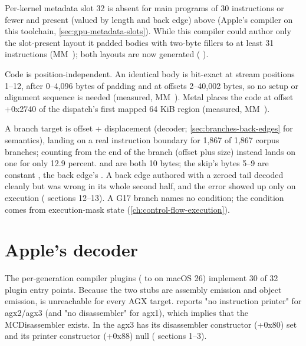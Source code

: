 Per-kernel metadata slot 32 is absent for main programs of 30 instructions or fewer and present (valued by length and
back edge) above (Apple's compiler on this toolchain, \cref{sec:gpu-metadata-slots}). While this compiler could author
only the slot-present layout it padded bodies with two-byte fillers to at least 31 instructions (MM~); both
layouts are now generated ( ).

Code is position-independent. An identical body is bit-exact at stream positions 1–12, after 0–4,096 bytes of padding
and at offsets 2–40,002 bytes, so no setup or alignment sequence is needed (measured, MM~). Metal places the code
at offset +0x2740 of the dispatch's first mapped 64 KiB region (measured, MM~).

A branch target is offset + displacement (decoder; \cref{sec:branches-back-edges} for semantics), landing on a real
instruction boundary for 1,867 of 1,867 corpus branches; counting from the end of the branch (offset plus size) instead
lands on one for only 12.9 percent.  and  are
both 10 bytes; the skip's bytes 5–9 are constant , the back edge's . A back
edge authored with a zeroed tail decoded cleanly but was wrong in its whole second half, and the error showed up only on
execution ( sections 12–13). A G17 branch names no condition; the condition comes from
execution-mask state (\cref{ch:control-flow-execution}).

\section{Apple's decoder}\label{sec:decoder}

The per-generation compiler plugins ( to  on macOS 26) implement 30 of
32 plugin entry points. Because the two stubs are assembly emission and object emission,  is unreachable for
every AGX target.  reports "no instruction printer" for agx2/agx3 (and "no disassembler" for agx1), which implies
that the MCDisassembler exists. In  the agx3  has its
disassembler constructor (+0x80) set and its printer constructor (+0x88) null
( sections 1–3).

